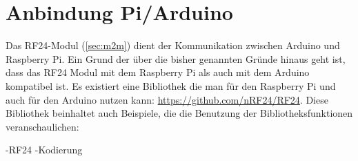 \section{Anbindung Pi/Arduino}
Das RF24-Modul (\ref{sec:m2m}) dient der Kommunikation zwischen Arduino und Raspberry Pi. Ein Grund der über die bisher genannten Gründe hinaus geht ist, dass das RF24 Modul mit dem Raspberry Pi als auch mit dem Arduino kompatibel ist. Es existiert eine Bibliothek die man für den Raspberry Pi und auch für den Arduino nutzen kann: \url{https://github.com/nRF24/RF24}. Diese Bibliothek beinhaltet auch Beispiele, die die Benutzung der Bibliotheksfunktionen veranschaulichen: 

 


  
-RF24
-Kodierung